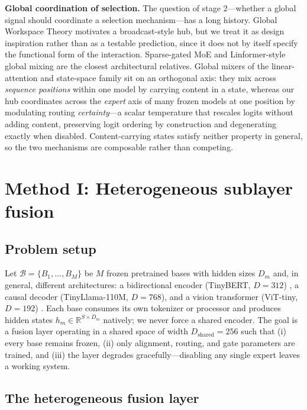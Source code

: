 \documentclass[10pt,twoside]{article}
\newcommand{\R}{\mathbb{R}}
\theoremstyle{definition}
\theoremstyle{plain}
\theoremstyle{remark}
\begin{document}
\textbf{Global coordination of selection.} The question of stage 2---whether a global signal should coordinate a selection mechanism---has a long history. Global Workspace Theory \citep{baarsCognitiveTheoryConsciousness1988} motivates a broadcast-style hub, but we treat it as design inspiration rather than as a testable prediction, since it does not by itself specify the functional form of the interaction. Sparse-gated MoE \citep{shazeerOutrageouslyLargeNeural2017} and Linformer-style global mixing \citep{wangLinformerSelfAttentionLinear2020} are the closest architectural relatives. Global mixers of the linear-attention and state-space family \citep{katharopoulos2020,gu2022s4,gu2023mamba} sit on an orthogonal axis: they mix across \emph{sequence positions} within one model by carrying content in a state, whereas our hub coordinates across the \emph{expert} axis of many frozen models at one position by modulating routing \emph{certainty}---a scalar temperature that rescales logits without adding content, preserving logit ordering by construction and degenerating exactly when disabled. Content-carrying states satisfy neither property in general, so the two mechanisms are composable rather than competing.

\section{Method I: Heterogeneous sublayer fusion}
\label{sec:method}

\subsection{Problem setup}
\label{sec:setup}

Let $\mathcal{B} = \{B_1, \dots, B_M\}$ be $M$ frozen pretrained bases with hidden sizes $D_m$ and, in general, different architectures: a bidirectional encoder (TinyBERT, $D{=}312$) \citep{jiao2020,devlin2019}, a causal decoder (TinyLlama-110M, $D{=}768$), and a vision transformer (ViT-tiny, $D{=}192$) \citep{dosovitskiy2021}. Each base consumes its own tokenizer or processor and produces hidden states $h_m \in \R^{S \times D_m}$ natively; we never force a shared encoder. The goal is a fusion layer operating in a shared space of width $D_{\text{shared}} = 256$ such that (i) every base remains frozen, (ii) only alignment, routing, and gate parameters are trained, and (iii) the layer degrades gracefully---disabling any single expert leaves a working system.

\subsection{The heterogeneous fusion layer}
\label{sec:layer}
\end{document}
